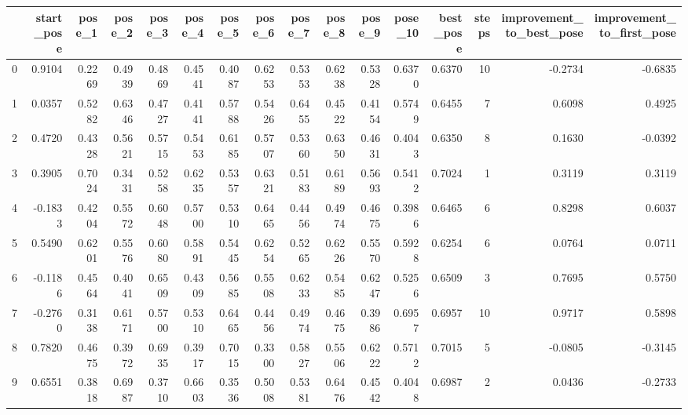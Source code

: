 \begin{tabular}{lrrrrrrrrrrrrrrr}
\toprule
{} &  start\_pose &  pose\_1 &  pose\_2 &  pose\_3 &  pose\_4 &  pose\_5 &  pose\_6 &  pose\_7 &  pose\_8 &  pose\_9 &  pose\_10 &  best\_pose &  steps &  improvement\_to\_best\_pose &  improvement\_to\_first\_pose \\
\midrule
0  &      0.9104 &  0.2269 &  0.4939 &  0.4869 &  0.4541 &  0.4087 &  0.6253 &  0.5353 &  0.6238 &  0.5328 &   0.6370 &     0.6370 &     10 &                   -0.2734 &                    -0.6835 \\
1  &      0.0357 &  0.5282 &  0.6346 &  0.4727 &  0.4141 &  0.5788 &  0.5426 &  0.6455 &  0.4522 &  0.4154 &   0.5749 &     0.6455 &      7 &                    0.6098 &                     0.4925 \\
2  &      0.4720 &  0.4328 &  0.5621 &  0.5715 &  0.5453 &  0.6185 &  0.5707 &  0.5360 &  0.6350 &  0.4631 &   0.4043 &     0.6350 &      8 &                    0.1630 &                    -0.0392 \\
3  &      0.3905 &  0.7024 &  0.3431 &  0.5258 &  0.6235 &  0.5357 &  0.6321 &  0.5183 &  0.6189 &  0.5693 &   0.5412 &     0.7024 &      1 &                    0.3119 &                     0.3119 \\
4  &     -0.1833 &  0.4204 &  0.5572 &  0.6048 &  0.5700 &  0.5310 &  0.6465 &  0.4456 &  0.4974 &  0.4675 &   0.3986 &     0.6465 &      6 &                    0.8298 &                     0.6037 \\
5  &      0.5490 &  0.6201 &  0.5576 &  0.6080 &  0.5891 &  0.5445 &  0.6254 &  0.5265 &  0.6226 &  0.5570 &   0.5928 &     0.6254 &      6 &                    0.0764 &                     0.0711 \\
6  &     -0.1186 &  0.4564 &  0.4041 &  0.6509 &  0.4309 &  0.5685 &  0.5508 &  0.6233 &  0.5485 &  0.6247 &   0.5256 &     0.6509 &      3 &                    0.7695 &                     0.5750 \\
7  &     -0.2760 &  0.3138 &  0.6171 &  0.5700 &  0.5310 &  0.6465 &  0.4456 &  0.4974 &  0.4675 &  0.3986 &   0.6957 &     0.6957 &     10 &                    0.9717 &                     0.5898 \\
8  &      0.7820 &  0.4675 &  0.3972 &  0.6935 &  0.3917 &  0.7015 &  0.3300 &  0.5827 &  0.5506 &  0.6222 &   0.5712 &     0.7015 &      5 &                   -0.0805 &                    -0.3145 \\
9  &      0.6551 &  0.3818 &  0.6987 &  0.3710 &  0.6603 &  0.3536 &  0.5008 &  0.5381 &  0.6476 &  0.4542 &   0.4048 &     0.6987 &      2 &                    0.0436 &                    -0.2733 \\

\end{tabular}
